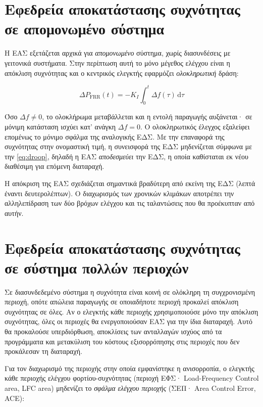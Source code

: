 \section{Εφεδρεία αποκατάστασης συχνότητας σε απομονωμένο σύστημα}

Η ΕΑΣ εξετάζεται αρχικά για \emph{απομονωμένο} σύστημα, χωρίς διασυνδέσεις με γειτονικά
συστήματα. Στην περίπτωση αυτή το μόνο μέγεθος ελέγχου είναι η απόκλιση συχνότητας και ο
κεντρικός ελεγκτής εφαρμόζει \emph{ολοκληρωτική} δράση:

\begin{equation}
\Delta P_{\mathrm{FRR}}(t) = -K_I \int_0^{t} \Delta f(\tau)\,\mathrm{d}\tau
\label{eq:frr-isolated}
\end{equation}

Όσο $\Delta f \neq 0$, το ολοκλήρωμα μεταβάλλεται και η εντολή παραγωγής αυξάνεται· σε μόνιμη
κατάσταση ισχύει κατ' ανάγκη $\Delta f = 0$. Ο ολοκληρωτικός έλεγχος εξαλείφει επομένως το
μόνιμο σφάλμα της αναλογικής ΕΔΣ. Με την επαναφορά της συχνότητας στην ονομαστική τιμή, η
συνεισφορά της ΕΔΣ μηδενίζεται σύμφωνα με την \eqref{eq:droop}, δηλαδή η ΕΑΣ
\emph{αποδεσμεύει} την ΕΔΣ, η οποία καθίσταται εκ νέου διαθέσιμη για επόμενη διαταραχή.

Η απόκριση της ΕΑΣ σχεδιάζεται σημαντικά βραδύτερη από εκείνη της ΕΔΣ (λεπτά έναντι
δευτερολέπτων). Ο διαχωρισμός των χρονικών κλιμάκων αποτρέπει την αλληλεπίδραση των δύο
βρόχων ελέγχου και τις ταλαντώσεις που θα προέκυπταν από αυτήν.

\section{Εφεδρεία αποκατάστασης συχνότητας σε σύστημα πολλών περιοχών}
\label{sec:frr-multi}

Σε διασυνδεδεμένο σύστημα η συχνότητα είναι κοινή σε ολόκληρη τη συγχρονισμένη περιοχή,
οπότε απώλεια παραγωγής σε οποιαδήποτε περιοχή προκαλεί απόκλιση συχνότητας σε όλες. Αν ο
ελεγκτής κάθε περιοχής χρησιμοποιούσε μόνο την απόκλιση συχνότητας, όλες οι περιοχές θα
ενεργοποιούσαν ΕΑΣ για την ίδια διαταραχή. Αυτό θα προκαλούσε υπερδιόρθωση, αποκλίσεις των
ανταλλαγών ισχύος από τα προγράμματα και μετακύλιση του κόστους εξισορρόπησης στις περιοχές
που δεν προκάλεσαν τη διαταραχή.

Για τον διαχωρισμό της περιοχής στην οποία εμφανίστηκε η ανισορροπία, ο ελεγκτής κάθε
περιοχής ελέγχου φορτίου-συχνότητας (περιοχή ΕΦΣ· Load-Frequency Control area, LFC area) μηδενίζει το \emph{σφάλμα ελέγχου
περιοχής} (ΣΕΠ· Area Control Error, ACE):

